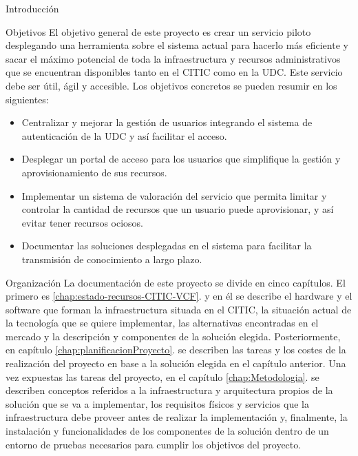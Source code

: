 \begin{chapter}{Introducción}
\begin{section}{Objetivos}
El objetivo general de este proyecto es crear un servicio piloto desplegando una herramienta sobre el sistema actual para hacerlo más eficiente y sacar el máximo potencial de toda la infraestructura y recursos administrativos que se encuentran disponibles tanto en el CITIC como en la UDC. Este servicio debe ser útil, ágil y accesible.
Los objetivos concretos se pueden resumir en los siguientes:
\begin{itemize}
    \item Centralizar y mejorar la gestión de usuarios integrando el sistema de autenticación de la UDC y así facilitar el acceso.
    \item Desplegar un portal de acceso para los usuarios que simplifique la gestión y aprovisionamiento de sus recursos.
    \item Implementar un sistema de valoración del servicio que permita limitar y controlar la cantidad de recursos que un usuario puede aprovisionar, y así evitar tener recursos ociosos.
    \item Documentar las soluciones desplegadas en el sistema para facilitar la transmisión de conocimiento a largo plazo.
\end{itemize}
\end{section}

\begin{section}{Organización}
    La documentación de este proyecto se divide en cinco capítulos. El primero es \ref{chap:estado-recursos-CITIC-VCF}. y en él se describe el hardware y el software que forman la infraestructura situada en el CITIC, la situación actual de la tecnología que se quiere implementar, las alternativas encontradas en el mercado y la descripción y componentes de la solución elegida. Posteriormente, en capítulo \ref{chap:planificacionProyecto}. se describen las tareas y los costes de la realización del proyecto en base a la solución elegida en el capítulo anterior. Una vez expuestas las tareas del proyecto, en el capítulo \ref{chap:Metodologia}. se describen conceptos referidos a la infraestructura y arquitectura propios de la solución que se va a implementar, los requisitos físicos y servicios que la infraestructura debe proveer antes de realizar la implementación y, finalmente, la instalación y funcionalidades de los componentes de la solución dentro de un entorno de pruebas necesarios para cumplir los objetivos del proyecto.
\end{section}

\end{chapter}